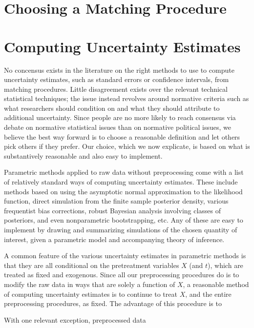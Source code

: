 \documentclass[11pt,titlepage]{article}
\begin{document}
\section{Choosing a Matching Procedure}

\section{Computing Uncertainty Estimates}

No concensus exists in the literature on the right methods to use to
compute uncertainty estimates, such as standard errors or confidence
intervals, from matching procedures.  Little disagreement exists over
the relevant technical statistical techniques; the issue instead
revolves around normative criteria such as what researchers should
condition on and what they should attribute to additional uncertainty.
Since people are no more likely to reach consensus via debate on
normative statistical issues than on normative political issues, we
believe the best way forward is to choose a reasonable definition and
let others pick others if they prefer.  Our choice, which we now
explicate, is based on what is substantively reasonable and also easy
to implement.

Parametric methods applied to raw data without preprocessing come with
a list of relatively standard ways of computing uncertainty estimates.
These include methods based on using the asymptotic normal
approximation to the likelihood function, direct simulation from the
finite sample posterior density, various frequentist bias corrections,
robust Bayesian analysis involving classes of posteriors, and even
nonparametric bootstrapping, etc.  Any of these are easy to implement
by drawing and summarizing simulations of the chosen quantity of
interest, given a parametric model and accompanying theory of
inference.

A common feature of the various uncertainty estimates in parametric
methods is that they are all conditional on the pretreatment variables
$X$ (and $t$), which are treated as fixed and exogenous.  Since all
our preprocessing procedures do is to modify the raw data in ways that
are solely a function of $X$, a reasonable method of computing
uncertainty estimates is to continue to treat $X$, and the entire
preprocessing procedures, as fixed.  The advantage of this procedure
is to

With one relevant exception, preprocessed data

\end{document}

